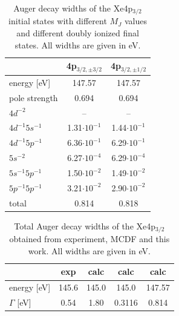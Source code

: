 \begin{table}[h]
 \centering
 \caption{Auger decay widths of the Xe4p$_{3/2}$ initial states with
          different $M_J$ values and different doubly ionized final
          states.
          All widths are given in \unit{eV}.}
 \begin{tabular}{lcc}
   \toprule
                      & 4p$_{3/2,\pm 3/2}$ & 4p$_{3/2,\pm 1/2}$  \\
   \midrule                                                      
   energy [\unit{eV}] &   147.57           &    147.57          \\
   pole strength       &     0.694          &      0.694         \\
   \midrule                                                     
   $4d^{-2}$          &      --            &        --            \\
   $4d^{-1}5s^{-1}$   & 1.31$\cdot10^{-1}$ & 1.44$\cdot10^{-1}$ \\
   $4d^{-1}5p^{-1}$   & 6.36$\cdot10^{-1}$ & 6.29$\cdot10^{-1}$ \\
   $5s^{-2}$          & 6.27$\cdot10^{-4}$ & 6.29$\cdot10^{-4}$ \\
   $5s^{-1}5p^{-1}$   & 1.50$\cdot10^{-2}$ & 1.49$\cdot10^{-2}$ \\
   $5p^{-1}5p^{-1}$   & 3.21$\cdot10^{-2}$ & 2.90$\cdot10^{-2}$ \\
   \midrule
   total              &   0.814            &   0.818            \\
   \bottomrule
 \end{tabular}
 \label{table:xe_auger_rest}
\end{table}


\begin{table}[]
 \centering
 \caption{Total Auger decay widths of the Xe4p$_{3/2}$ obtained from
          experiment, \ac{MCDF} and this work. All widths are given in \unit{eV}.}
 \begin{tabular}{lcccc}
   \toprule
                        & exp   & calc\footnotemark[1] & calc\footnotemark[2] & calc\footnotemark[3] \\
   \midrule                                                                         
   energy [\unit{eV}]   & 145.6 &  145.0       &  145.0       &   147.57   \\
   $\Gamma$ [\unit{eV}] &  0.54 &  1.80        &  0.3116      &  0.814\\
   \bottomrule
 \end{tabular}
 \label{table:xe_auger_comp}
\end{table}

